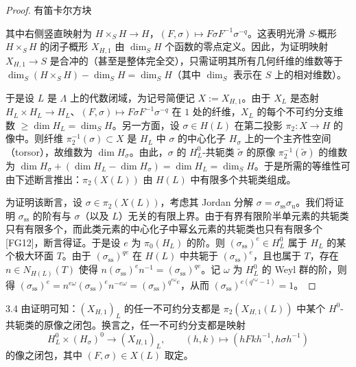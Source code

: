 \begin{proof}
有笛卡尔方块
\begin{center}
\end{center}
其中右侧竖直映射为 $H\times_S H\to H$，$(F,\sigma)\mapsto F\sigma F^{-1}\sigma^{-q}$。这表明光滑 $S$-概形 $H\times_S H$ 的闭子概形 $X_{H,1}$ 由 $\dim_S H$ 个函数的零点定义。因此，为证明映射 $X_{H,1}\to S$ 是合冲的（甚至是整体完全交），只需证明其所有几何纤维的维数等于 $\dim_S(H\times_S H)-\dim_S H=\dim_S H$（其中 $\dim_S$ 表示在 $S$ 上的相对维数）。

于是设 $L$ 是 $\Lambda$ 上的代数闭域，为记号简便记 $X:=X_{H,1}$。由于 $X_L$ 是态射 $H_L\times H_L\to H_L$、$(F,\sigma)\mapsto F\sigma F^{-1}\sigma^{-q}$ 在 $1$ 处的纤维，$X_L$ 的每个不可约分支维数 $\ge\dim H_L=\dim_S H$。另一方面，设 $\sigma\in H(L)$ 在第二投影 $\pi_2:X\to H$ 的像中。则纤维 $\pi_2^{-1}(\sigma)\subset X$ 是 $H_L$ 中 $\sigma$ 的中心化子 $H_\sigma$ 上的一个主齐性空间（torsor），故维数为 $\dim H_\sigma$。由此，$\sigma$ 的 $H^0_L$-共轭类 $\tilde\sigma$ 的原像 $\pi_2^{-1}(\tilde\sigma)$ 的维数为 $\dim H_\sigma+(\dim H_L-\dim H_\sigma)=\dim H_L=\dim_S H$。于是所需的等维性可由下述断言推出：$\pi_2(X(L))$ 由 $H(L)$ 中有限多个共轭类组成。

为证明该断言，设 $\sigma\in\pi_2(X(L))$，考虑其 Jordan 分解 $\sigma=\sigma_{\mathrm{ss}}\sigma_{\mathrm{u}}$。我们将证明 $\sigma_{\mathrm{ss}}$ 的阶有与 $\sigma$（以及 $L$）无关的有限上界。由于有界有限阶半单元素的共轭类只有有限多个，而此类元素的中心化子中幂幺元素的共轭类也只有有限多个 [FG12]，断言得证。于是设 $e$ 为 $\pi_0(H_L)$ 的阶。则 $(\sigma_{\mathrm{ss}})^e\in H^0_L$ 属于 $H_L$ 的某个极大环面 $T$。由于 $(\sigma_{\mathrm{ss}})^{qe}$ 在 $H(L)$ 中共轭于 $(\sigma_{\mathrm{ss}})^e$，且也属于 $T$，存在 $n\in N_{H(L)}(T)$ 使得 $n(\sigma_{\mathrm{ss}})^e n^{-1}=(\sigma_{\mathrm{ss}})^{qe}$。记 $\omega$ 为 $H^0_L$ 的 Weyl 群的阶，则得 $(\sigma_{\mathrm{ss}})^e=n^{e\omega}(\sigma_{\mathrm{ss}})^e n^{-e\omega}=(\sigma_{\mathrm{ss}})^{q^{e\omega}e}$，从而 $(\sigma_{\mathrm{ss}})^{e(q^{e\omega}-1)}=1$。
\end{proof}

\begin{rem}{3.4}
由证明可知：$(X_{H,1})_L$ 的任一不可约分支都是 $\pi_2(X_{H,1}(L))$ 中某个 $H^0$-共轭类的原像之闭包。换言之，任一不可约分支都是映射
\[
H^0_L\times(H_\sigma)^0\longrightarrow(X_{H,1})_L,\qquad (h,k)\mapsto(hFkh^{-1},h\sigma h^{-1})
\]
的像之闭包，其中 $(F,\sigma)\in X(L)$ 取定。
\end{rem}

